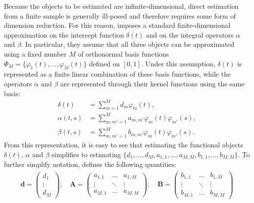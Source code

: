 \documentclass[12pt,a4paper]{article}
\theoremstyle{definition}
\begin{document}
Because the objects to be estimated are infinite-dimensional, direct estimation from a finite sample is generally ill-posed and therefore requires some form of dimension reduction. For this reason, \citet{Aue2017} imposes a standard finite-dimensional approximation on the intercept function $\delta(t)$ and on the integral operators $\alpha$ and $\beta$. In particular, they assume that all three objects can be approximated using a fixed number $M$ of orthonormal basis functions $\Phi_M = \{\varphi_1(t), \ldots, \varphi_M(t)\}$ defined on $[0,1]$. Under this assumption, $\delta(t)$ is represented as a finite linear combination of these basis functions, while the operators $\alpha$ and $\beta$ are represented through their kernel functions using the same basis:
\begin{align}
\label{basisdecompositiondelta}
    \delta(t) &= \sum_{m=1}^M d_m \varphi_m(t), \\
    \alpha(t,s) &= \sum_{m,m'=1}^M a_{m,m'} \varphi_m(t)\varphi_{m'}(s), \\
    \label{basisdecompositionbeta}
    \beta(t,s) &= \sum_{m,m'=1}^M b_{m,m'} \varphi_m(t)\varphi_{m'}(s).
\end{align}
From this representation, it is easy to see that estimating the functional objects $\delta(t)$, $\alpha$ and $\beta$ simplifies to estimating $\{d_1,\ldots,d_M,a_{1,1},\ldots,a_{M,M},b_{1,1},\ldots,b_{M,M}\}$. To further simplify notation, \citet{Aue2017} defines the following quantities:
\begin{align}
\label{MatricesdAB}
    \mathbf{d}=\begin{pmatrix}
        d_1\\
        \vdots\\
        d_M
    \end{pmatrix}; \quad
    \mathbf{A}=\begin{pmatrix}
        a_{1,1} & \ldots & a_{1,M}\\
        \vdots & \ddots & \vdots\\
        a_{M,1} & \ldots & a_{M,M}
    \end{pmatrix}; \quad
    \mathbf{B}=\begin{pmatrix}
        b_{1,1} & \ldots & b_{1,M}\\
        \vdots & \ddots & \vdots\\
        b_{M,1} & \ldots & b_{M,M}
    \end{pmatrix}
\end{align}
\end{document}
